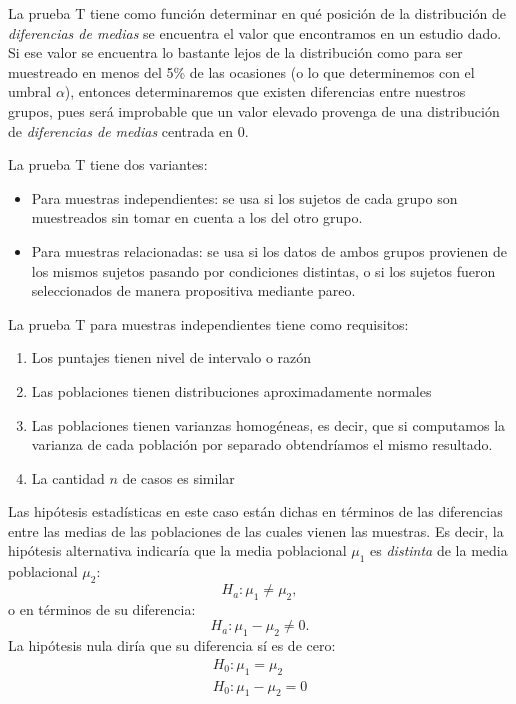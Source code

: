 \documentclass[a4paper,12pt]{article}
\begin{document}
La prueba T tiene como función determinar en qué posición de la distribución de {\slshape diferencias de medias} se encuentra el valor que encontramos en un estudio dado. Si ese valor se encuentra lo bastante lejos de la distribución como para ser muestreado en menos del 5\% de las ocasiones (o lo que determinemos con el umbral $\alpha$), entonces determinaremos que existen diferencias entre nuestros grupos, pues será improbable que un valor elevado provenga de una distribución de {\slshape diferencias de medias} centrada en 0.

La prueba T tiene dos variantes:
\begin{itemize}
  \item Para muestras independientes: se usa si los sujetos de cada grupo son muestreados sin tomar en cuenta a los del otro grupo.
  \item Para muestras relacionadas: se usa si los datos de ambos grupos provienen de los mismos sujetos pasando por condiciones distintas, o si los sujetos fueron seleccionados de manera propositiva mediante pareo.
\end{itemize}

La prueba T para muestras independientes tiene como requisitos:
\begin{enumerate}
  \item Los puntajes tienen nivel de intervalo o razón
  \item Las poblaciones tienen distribuciones aproximadamente normales
  \item Las poblaciones tienen varianzas homogéneas, es decir, que si computamos la varianza de cada población por separado obtendríamos el mismo resultado.
  \item La cantidad $n$ de casos es similar
\end{enumerate}

Las hipótesis estadísticas en este caso están dichas en términos de las diferencias entre las medias de las poblaciones de las cuales vienen las muestras. Es decir, la hipótesis alternativa indicaría que la media poblacional $\mu_{1}$ es {\slshape distinta} de la media poblacional $\mu_{2}$:
\[
  H_{a}: \mu_{1} \neq \mu_{2}
,\]
o en términos de su diferencia:
\[
  H_{a}: \mu_{1} - \mu_{2} \neq 0
.\]
La hipótesis nula diría que su diferencia sí es de cero:
\begin{eqnarray*}
  H_{0}: \mu_{1} = \mu_{2}\\
  H_{0}: \mu_{1} - \mu_{2} = 0
\end{eqnarray*}
\end{document}
